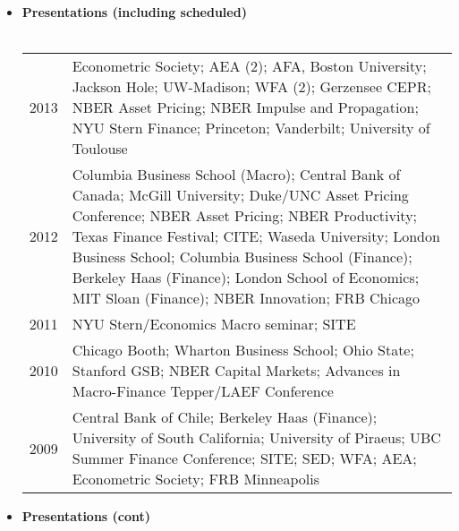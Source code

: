 \documentclass[11pt,a4paper,sans]{moderncv}
\begin{document}
\begin{resume}
\begin{itemize}
\vspace{0.5cm}
\item \textbf{Presentations (including scheduled)} \\ \\
\begin{tabular}{lp{14cm}}
2013 & Econometric Society; AEA (2); AFA, Boston University; Jackson Hole; UW-Madison; WFA (2); Gerzensee CEPR; NBER Asset Pricing; NBER Impulse and Propagation; NYU Stern Finance; Princeton; Vanderbilt; University of Toulouse \\[0.2cm]
2012 & Columbia Business School (Macro); Central Bank of Canada; McGill University; Duke/UNC Asset Pricing Conference; NBER Asset Pricing; NBER Productivity; Texas Finance Festival; CITE; Waseda University; London Business School; Columbia Business School (Finance); Berkeley Haas (Finance);  London School of Economics; MIT Sloan (Finance); NBER Innovation; FRB Chicago\\[0.2cm]
2011 & NYU Stern/Economics Macro seminar; SITE \\[0.2cm]
2010 & Chicago Booth; Wharton Business School; Ohio State; Stanford GSB;  NBER Capital Markets; Advances in Macro-Finance Tepper/LAEF Conference\\[0.2cm]
2009 & Central Bank of Chile; Berkeley Haas (Finance); University of South California;   University of Piraeus; UBC Summer Finance Conference; SITE;   SED; WFA; AEA; Econometric Society; FRB Minneapolis\\[0.2cm]
\end{tabular}
\newpage
\item \textbf{Presentations (cont)} \\ \\
\begin{tabular}{lp{14cm}}

\end{tabular}
\end{itemize}
\end{resume}
\end{document}

